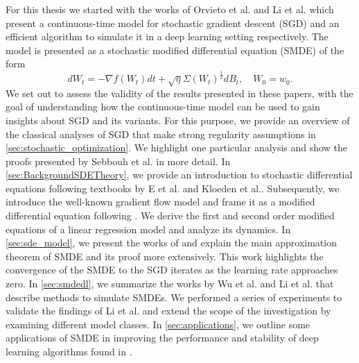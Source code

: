 \documentclass[12pt]{article}
\theoremstyle{definition}
\numberwithin{equation}{section}
\begin{document}
For this thesis we started with the works of Orvieto et al.\cite{orvietoContinuoustimeModelsStochastic2019a} and Li et al.\cite{liValidityModelingSGD2021} which present a continuous-time model for stochastic gradient descent (SGD) and an efficient algorithm to simulate it in a deep learning setting respectively. The model is presented as a stochastic modified differential equation (SMDE) of the form
\begin{equation*}
  d W_t = -\nabla f(W_t) dt + \sqrt{\eta}\Sigma(W_t)^{\frac{1}{2}}dB_t, \quad W_0 = w_0.
\end{equation*}
We set out to assess the validity of the results presented in these papers, with the goal of understanding how the continuous-time model can be used to gain insights about SGD and its variants.
For this purpose, we provide an overview of the classical analyses of SGD that make strong regularity assumptions in \autoref{sec:stochastic_optimization}. We highlight one particular analysis and show the proofs presented by Sebbouh et al.\cite{sebbouhAlmostSureConvergence2021} in more detail.
In \autoref{sec:BackgroundSDETheory}, we provide an introduction to stochastic differential equations following textbooks by E et al.\cite{eAppliedStochasticAnalysis2021} and Kloeden et al.\cite{kloedenNumericalSolutionStochastic2013}. Subsequently, we introduce the well-known gradient flow model and frame it as a modified differential equation following \cite{smithOriginImplicitRegularization2021}. We derive the first and second order modified equations of a linear regression model and analyze its dynamics.
In \autoref{sec:sde_model}, we present the works of \cite{liStochasticModifiedEquations2019} and explain the main approximation theorem of SMDE and its proof more extensively. This work highlights the convergence of the SMDE to the SGD iterates as the learning rate approaches zero.
In \autoref{sec:smdedl}, we summarize the works by Wu et al. \cite{wuNoisyGradientDescent2020a} and Li et al.\cite{liValidityModelingSGD2021} that describe methods to simulate SMDEs. We performed a series of experiments to validate the findings of Li et al.\cite{liValidityModelingSGD2021} and extend the scope of the investigation by examining different model classes.  
In \autoref{sec:applications}, we outline some applications of SMDE in improving the performance and stability of deep learning algorithms found in \cite{fontaineConvergenceRatesApproximation2021, zhouTheoreticallyUnderstandingWhy2020, liValidityModelingSGD2021}.
\end{document}
